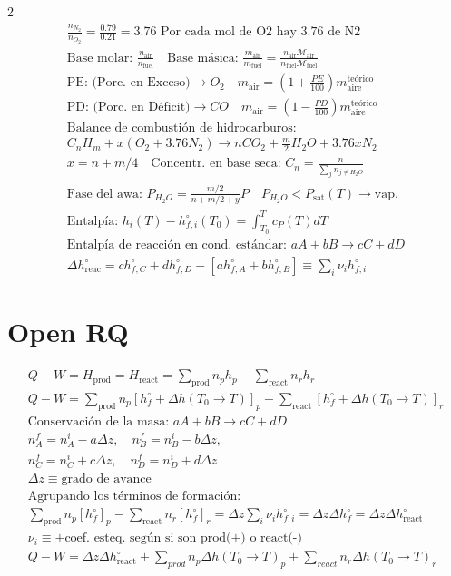 \documentclass[9pt]{article}
\begin{document}
\begin{multicols}{2}
\begin{gather*}
  \frac{n_{N_2}}{n_{O_2}} = \frac{0.79}{0.21}=3.76 \text{   Por cada mol de O2 hay 3.76 de N2}\\
  \text{Base molar: } \frac{n_\text{air}}{n_\text{fuel}}\quad \text{Base másica: } \frac{m_\text{air}}{m_\text{fuel}} = \frac{n_\text{air}\mathcal{M}_\text{air}}{n_\text{fuel}\mathcal{M}_\text{fuel}}\\
  \text{PE: (Porc. en Exceso)}\rightarrow O_2 \quad m_\text{air} = \left(1 + \frac{PE}{100}\right)m_\text{aire}^\text{teórico}\\
  \text{PD: (Porc. en Déficit)}\rightarrow CO \quad m_\text{air} = \left(1 - \frac{PD}{100}\right) m_\text{aire}^\text{teórico}\\
  \text{Balance de combustión de hidrocarburos:}\\
  C_n H_m + x(O_2 + 3.76 N_2) \rightarrow n CO_2 + \frac{m}{2}H_2O + 3.76x N_2\\
  x = n + m/4 \quad  \text{Concentr. en base seca: } C_n= \frac{n}{\sum_{j} n_{j\neq H_2O}} \\
  \text{Fase del awa: } P_{H_2O} = \frac{m/2}{n+m/2+y}P \quad P_{H_2O}<P_\text{sat}(T) \rightarrow \text{vap.}\\
  \text{Entalpía: } h_i(T) -h_{f,i}^\circ(T_0) = \int_{T_0}^{T}c_P(T)dT\\
  \text{Entalpía de reacción en cond. estándar: } aA +bB \rightarrow cC + dD \\
  \Delta h_\text{reac}^\circ = ch_{f,C}^\circ + dh_{f,D}^\circ - [a h_{f,A}^\circ + bh_{f,B}^\circ] \equiv \sum_{i}\nu_i h_{f,i}^\circ
\end{gather*}

\section{Open RQ}
\begin{gather*}
  Q-W = H_\text{prod}=H_\text{react} =\sum_\text{prod} n_p h_p - \sum_\text{react}n_r h_r\\
  Q-W = \sum_\text{prod} n_p [h_f^\circ + \Delta h (T_0 \rightarrow T)]_p - \sum_\text{react}[h_f^\circ + \Delta h (T_0 \rightarrow T)]_r\\
  \text{Conservación de la masa: } aA +bB \rightarrow cC + dD \\
  n_A^f = n_A^i - a\Delta z, \quad n_B^f = n_B^i - b\Delta z,\\
  n_C^f = n_C^i + c\Delta z, \quad n_D^f = n_D^i + d\Delta z\\
  \Delta z \equiv \text{grado de avance}\\
  \text{Agrupando los términos de formación:}\\
  \sum_\text{prod} n_p [h_f^\circ]_p - \sum_\text{react} n_r [h_f^\circ]_r = \Delta z  \sum_{i} \nu_i h_{f,i}^\circ = \Delta z \Delta h^\circ_f =\Delta z \Delta h^\circ_\text{react}\\
  \nu_i \equiv \pm \text{coef. esteq. según si son prod(+) o react(-)}\\
  Q - W = \Delta z \Delta h_\text{react}^\circ + \sum_{prod} n_p \Delta h(T_0 \rightarrow T)_p + \sum_{react} n_r \Delta h(T_0 \rightarrow T)_r
\end{gather*}


\end{multicols}
\end{document}
